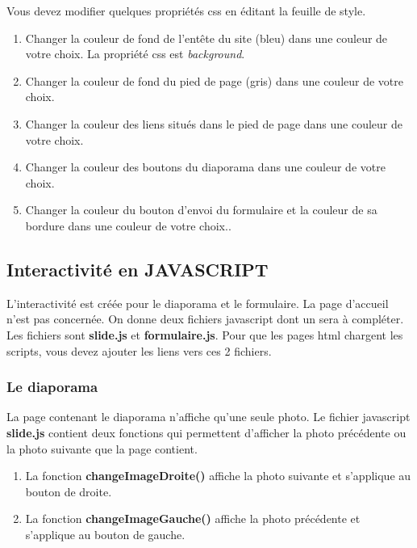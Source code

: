 Vous devez modifier quelques propriétés css en éditant la feuille de
style.

\begin{enumerate}
\tightlist
\item
  Changer la couleur de fond de l'entête du site (bleu) dans une couleur
  de votre choix. La propriété css est \emph{background}.
\item
  Changer la couleur de fond du pied de page (gris) dans une couleur de
  votre choix.
\item
  Changer la couleur des liens situés dans le pied de page dans une
  couleur de votre choix.
\item
  Changer la couleur des boutons du diaporama dans une couleur de votre
  choix.
\item
  Changer la couleur du bouton d'envoi du formulaire et la couleur de sa
  bordure dans une couleur de votre choix..
\end{enumerate}

\hypertarget{interactivituxe9-en-javascript}{%
\subsection{Interactivité en
JAVASCRIPT}\label{interactivituxe9-en-javascript}}

L'interactivité est créée pour le diaporama et le formulaire. La page
d'accueil n'est pas concernée. On donne deux fichiers javascript dont un
sera à compléter. Les fichiers sont \textbf{slide.js} et
\textbf{formulaire.js}. Pour que les pages html chargent les scripts,
vous devez ajouter les liens vers ces 2 fichiers.

\hypertarget{le-diaporama}{%
\subsubsection{Le diaporama}\label{le-diaporama}}

La page contenant le diaporama n'affiche qu'une seule photo. Le fichier
javascript \textbf{slide.js} contient deux fonctions qui permettent
d'afficher la photo précédente ou la photo suivante que la page
contient.

\begin{enumerate}
\tightlist
\item
  La fonction \textbf{changeImageDroite()} affiche la photo suivante et
  s'applique au bouton de droite.
\item
  La fonction \textbf{changeImageGauche()} affiche la photo précédente
  et s'applique au bouton de gauche.
\end{enumerate}


